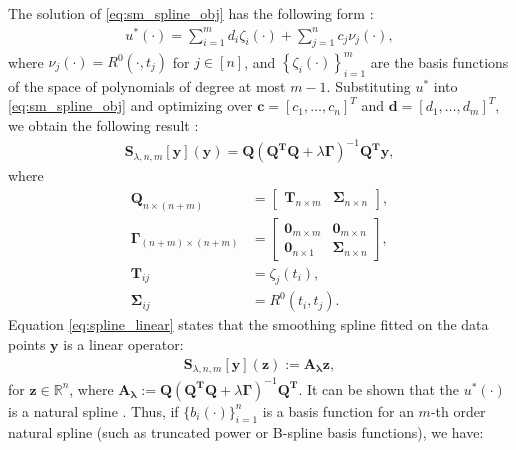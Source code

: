 \documentclass{article}
\newcommand{\spline}{\mathbf{S}_{\lambda,n,m}}
\begin{document}
The solution of \eqref{eq:sm_spline_obj} has the following form \citep{wahba1990spline,duchon1977splines}:
\begin{align}
    u^*(\cdot) = \sum^m_{i=1} d_i \zeta_i(\cdot) + \sum^n_{j=1} c_j \nu_j(\cdot),
\end{align}
where $\nu_j(\cdot) = R^0(\cdot, t_j)$ for $j \in [n]$, and $\left\{\zeta_i(\cdot)\right\}_{i=1}^m$ are the basis functions of the space of polynomials of degree at most $m-1$. Substituting $u^*$ into \eqref{eq:sm_spline_obj} and optimizing over $\mathbf{c} = [c_1,\dots, c_n]^T$ and $\mathbf{d} = [d_1,\dots, d_m]^T$, we obtain the following result \citep{wahba1990spline}:
\begin{align}\label{eq:spline_linear}
    \spline[\mathbf{y}](\mathbf{y}) = \mathbf{Q}\left(\mathbf{Q}^{\mathbf{T}} \mathbf{Q}+\lambda \mathbf{\Gamma}\right)^{-1} \mathbf{Q}^{\mathbf{T}} \mathbf{y},
\end{align}
where
\begin{align}
\mathbf{Q}_{n \times(n+m)}&=\left[\begin{array}{ll}
\mathbf{T}_{n \times m} & \boldsymbol{\Sigma}_{n \times n}
\end{array}\right], \nonumber \\
\mathbf{\Gamma}_{(n+m) \times(n+m)}&=\left[\begin{array}{cc}
\mathbf{0}_{m \times m} & \mathbf{0}_{m \times n} \nonumber  \\
\mathbf{0}_{n \times 1} & \boldsymbol{\Sigma}_{n \times n}
\end{array}\right], \nonumber \\
\boldsymbol{T}_{ij} &= \zeta_j(t_i),\nonumber \\
\boldsymbol{\Sigma}_{ij} &= R^0(t_i, t_j).
\end{align}
Equation \eqref{eq:spline_linear} states that the smoothing spline fitted on the data points $\mathbf{y}$ is a linear operator:
\begin{align}\label{eq:ssfunction_def}
\spline[\mathbf{y}](\mathbf{z}) := \mathbf{A_{\lambda}} \mathbf{z},
\end{align}
 for $\mathbf{z} \in \mathbb{R}^n$, where $\mathbf{A_\lambda}:=\mathbf{Q}\left(\mathbf{Q}^{\mathbf{T}} \mathbf{Q}+\lambda \mathbf{\Gamma}\right)^{-1} \mathbf{Q}^{\mathbf{T}}$. 
It can be shown that the $u^*(\cdot)$ is a natural spline \citep{wahba1975smoothing, wahba1990spline}. Thus, if $\{b_i(\cdot)\}_{i=1}^n$ is a basis function for an $m$-th order natural spline (such as truncated power or B-spline basis functions), we have:
\end{document}

